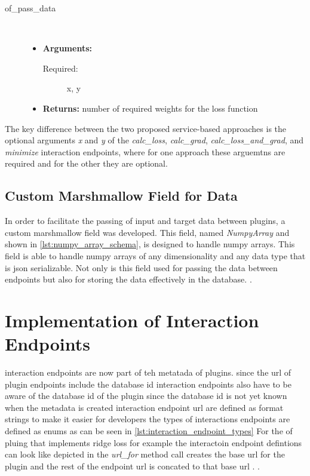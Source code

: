 \documentclass[
  a4paper,  %
  twoside,  %
  bibliography=totoc,
  headsepline,
  cleardoublepage=empty,
  parskip=half,
  draft=false
]{scrbook}
\begin{document}
\begin{description}
  \item[of\_pass\_data] \hfill \\
  \begin{itemize}
      \item \textbf{Arguments:}
      \begin{description}
          \item[Required:] x, y
      \end{description}
      \item \textbf{Returns:} number of required weights for the loss function
  \end{itemize}
\end{description}


The key difference between the two proposed service-based approaches is the optional arguments \emph{x} and \emph{y} of the \emph{calc\_loss}, \emph{calc\_grad}, \emph{calc\_loss\_and\_grad}, and \emph{minimize} interaction endpoints, where for one approach these arguemtns are required and for the other they are optional.


\subsection{Custom Marshmallow Field for Data}
\label{sec:customMarshmallowFieldForData}
In order to facilitate the passing of input and target data between plugins, a custom marshmallow field was developed.
This field, named \emph{NumpyArray} and shown in \ref{lst:numpy_array_schema}, is designed to handle numpy arrays.
This field is able to handle numpy arrays of any dimensionality and any data type that is json serializable.
Not only is this field used for passing the data between endpoints but also for storing the data effectively in the database.
.


\section{Implementation of Interaction Endpoints}
\label{sec:implementationOfInteractionEndpointMetadata}
interaction endpoints are now part of teh metatada of plugins.
since the url of plugin endpoints include the database id interaction endpoints also have to be aware of the database id of the plugin
since the database id is not yet known when the metadata is created interaction endpoint url are defined as format strings
to make it easier for developers the types of interactions endpoints are defined as enums as can be seen in \ref{lst:interaction_endpoint_types}
For the of pluing that implements ridge loss for example the interactoin endpoint defintions can look like depicted in
the \emph{url\_for} method call creates the base url for the plugin and the rest of the endpoint url is concated to that base url
.
.
\end{document}
